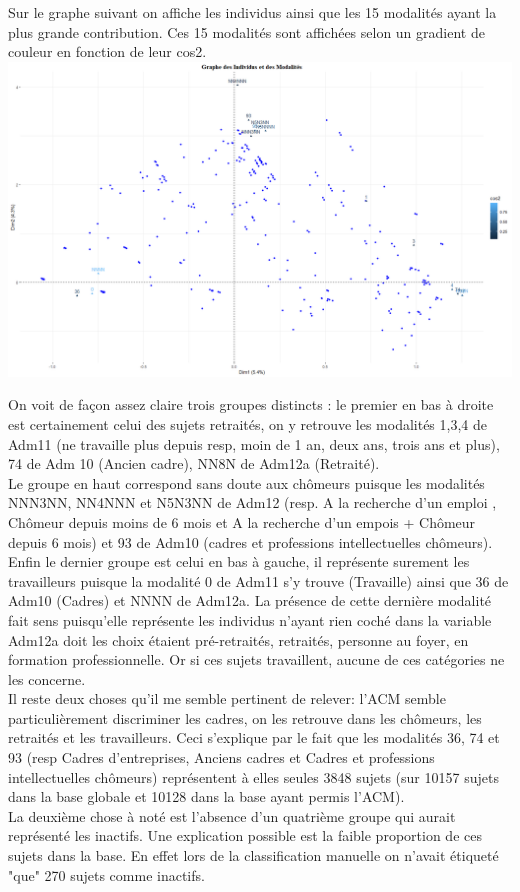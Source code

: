 \documentclass{book}
\begin{document}
\noindent
Sur le graphe suivant on affiche les individus ainsi que les 15 modalités ayant la plus grande contribution. Ces 15 modalités sont affichées selon un gradient de couleur en fonction de leur cos2. \\
\includegraphics[scale = 1]{ACM_var_ind.png}

On voit de façon assez claire trois groupes distincts : le premier en bas à droite est certainement celui des sujets retraités, on y retrouve les modalités 1,3,4 de Adm11 (ne travaille plus depuis resp, moin de 1 an, deux ans, trois ans et plus), 74 de Adm 10 (Ancien cadre), NN8N de Adm12a (Retraité).\\
Le groupe en haut correspond sans doute aux chômeurs puisque les modalités NNN3NN, NN4NNN et N5N3NN de Adm12 (resp. A la recherche d'un emploi , Chômeur depuis moins de 6 mois et A la recherche d'un empois + Chômeur depuis 6 mois) et 93 de Adm10 (cadres et professions intellectuelles chômeurs).\\
Enfin le dernier groupe est celui en bas à gauche, il représente surement les travailleurs puisque la modalité 0 de Adm11 s'y trouve (Travaille) ainsi que 36 de Adm10 (Cadres) et NNNN de Adm12a. La présence de cette dernière modalité fait sens puisqu'elle représente les individus n'ayant rien coché dans la variable Adm12a doit les choix étaient pré-retraités, retraités, personne au foyer, en formation professionnelle. Or si ces sujets travaillent, aucune de ces catégories ne les concerne.\\
Il reste deux choses qu'il me semble pertinent de relever: l'ACM semble particulièrement discriminer les cadres, on les retrouve dans les chômeurs, les retraités et les travailleurs. Ceci s'explique par le fait que les modalités 36, 74 et 93 (resp Cadres d'entreprises, Anciens cadres et Cadres et professions intellectuelles chômeurs) représentent à elles seules 3848 sujets (sur 10157 sujets dans la base globale et 10128 dans la base ayant permis l'ACM).\\
La deuxième chose à noté est l'absence d'un quatrième groupe qui aurait représenté les inactifs. Une explication possible est la faible proportion de ces sujets dans la base. En effet lors de la classification manuelle on n'avait étiqueté "que" 270 sujets comme inactifs. \\
\end{document}
